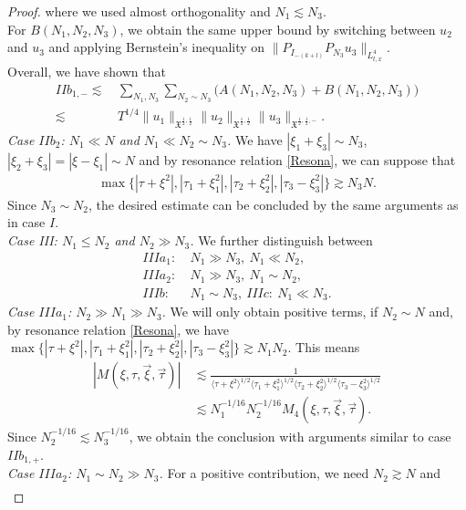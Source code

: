 \documentclass[reqno]{amsart}
\theoremstyle{Definitionl}
\theoremstyle{Definitionk}
\theoremstyle{definition}
\theoremstyle{Satzk}
\theoremstyle{Satzl}
\theoremstyle{Bemerkung}
\begin{document}
\begin{proof}
where we used almost orthogonality and $N_1\lesssim N_3$.\\[10pt]
For $B(N_1,N_2,N_3)$, we obtain the same upper bound by switching between $u_2$ and $u_3$ and applying Bernstein's inequality on $\|P_{I_{-(k+l)}}P_{N_3}u_3\|_{L^4_{t,x}}$.\\[10pt]
Overall, we have shown that
\begin{align*}
II{b_{1,-}}\lesssim&\, \sum_{N_1,N_3}\sum_{N_2\sim N_3}\big(A(N_1,N_2,N_3)+B(N_1,N_2,N_3)\big)\\
\lesssim&\, T^{1/4}\|u_1\|_{\mathfrak X^{\frac12,\frac12}}\|u_2\|_{\mathfrak X^{\frac12,\frac12}}\|u_3\|_{\mathfrak X^{\frac12,\frac12,-}}.
\end{align*}
\emph{Case $IIb_2$: $N_1\ll N$ and $N_1\ll N_2\sim N_3$. }We have $|\xi_1+\xi_3|\sim N_3$, $|\xi_2+\xi_3|=|\xi-\xi_1|\sim N$ and by resonance relation \eqref{Resona}, we can suppose that
\begin{align*}
\max\{|\tau+\xi^2|,|\tau_1+\xi_1^2|,|\tau_2+\xi_2^2|,|\tau_3-\xi_3^2|\}
\gtrsim N_3N.
\end{align*}
Since $N_3\sim N_2$, the desired estimate can be concluded by the same arguments as in case $I$.\\[10pt]
\emph{Case III: $N_1\le N_2$ and $N_2\gg N_3$. }We further distinguish between 
\begin{align*}
IIIa_1:&\ N_1\gg N_3,\ N_1\ll N_2,\\IIIa_2:&\ N_1\gg N_3,\ N_1\sim N_2,\\
IIIb:&\ N_1\sim N_3,\ 
IIIc:\ N_1\ll N_3. 
\end{align*}
\emph{Case $IIIa_1$: $N_2\gg N_1\gg N_3$. }We will only obtain positive terms, if $N_2\sim N$ and, by resonance relation \eqref{Resona}, we have $\max\{|\tau+\xi^2|,|\tau_1+\xi_1^2|,|\tau_2+\xi_2^2|,|\tau_3-\xi_3^2|\}\gtrsim N_1N_2$. This means
\begin{align}
|M(\xi,\tau,\vec\xi,\vec\tau)|&\,\lesssim \frac{1}{\langle\tau+\xi^2\rangle^{1/2}\langle\tau_1+\xi_1^2\rangle^{1/2}\langle\tau_2+\xi_2^2\rangle^{1/2}\langle\tau_3-\xi_3^2\rangle^{1/2}}\nonumber\\
&\,\lesssim N_1^{-1/16}N_2^{-1/16}M_4(\xi,\tau,\vec\xi,\vec\tau)\label{IIIa11}.
\end{align}
Since $N_2^{-1/16}\lesssim N_3^{-1/16}$, we obtain the conclusion with arguments similar to case $II{b_{1,+}}$.\\[10pt]
\emph{Case $IIIa_2$: $N_1\sim N_2\gg N_3$. }For a positive contribution, we need $N_2\gtrsim N$ and 
\begin{align*}

\end{align*}
\end{proof}
\end{document}

